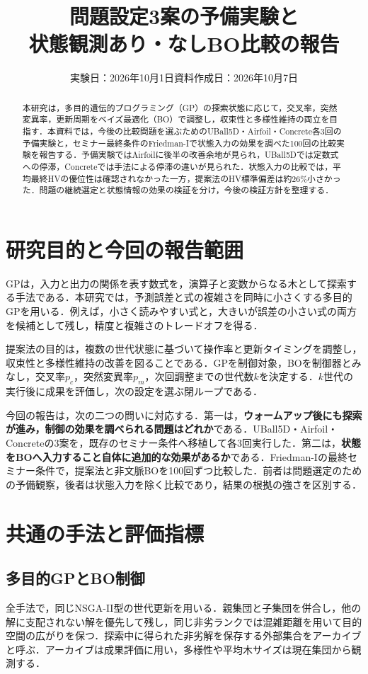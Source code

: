\documentclass[a4paper,10pt,twocolumn]{ltjsarticle}
\title{問題設定3案の予備実験と\\状態観測あり・なしBO比較の報告}
\author{}
\date{実験日：2026年10月1日\quad 資料作成日：2026年10月7日}
\begin{document}
\maketitle
\begin{abstract}
本研究は，多目的遺伝的プログラミング（GP）の探索状態に応じて，交叉率，突然変異率，更新周期をベイズ最適化（BO）で調整し，収束性と多様性維持の両立を目指す．本資料では，今後の比較問題を選ぶためのUBall5D・Airfoil・Concrete各3回の予備実験と，セミナー最終条件のFriedman-Iで状態入力の効果を調べた100回の比較実験を報告する．予備実験ではAirfoilに後半の改善余地が見られ，UBall5Dでは定数式への停滞，Concreteでは手法による停滞の違いが見られた．状態入力の比較では，平均最終HVの優位性は確認されなかった一方，提案法のHV標準偏差は約26\%小さかった．問題の継続選定と状態情報の効果の検証を分け，今後の検証方針を整理する．
\end{abstract}

\section{研究目的と今回の報告範囲}
GPは，入力と出力の関係を表す数式を，演算子と変数からなる木として探索する手法である．本研究では，予測誤差と式の複雑さを同時に小さくする多目的GPを用いる．例えば，小さく読みやすい式と，大きいが誤差の小さい式の両方を候補として残し，精度と複雑さのトレードオフを得る．

提案法の目的は，複数の世代状態に基づいて操作率と更新タイミングを調整し，収束性と多様性維持の改善を図ることである．GPを制御対象，BOを制御器とみなし，交叉率\(p_c\)，突然変異率\(p_m\)，次回調整までの世代数\(k\)を決定する．\(k\)世代の実行後に成果を評価し，次の設定を選ぶ閉ループである．

今回の報告は，次の二つの問いに対応する．第一は，\textbf{ウォームアップ後にも探索が進み，制御の効果を調べられる問題はどれか}である．UBall5D・Airfoil・Concreteの3案を，既存のセミナー条件へ移植して各3回実行した．第二は，\textbf{状態をBOへ入力すること自体に追加的な効果があるか}である．Friedman-Iの最終セミナー条件で，提案法と非文脈BOを100回ずつ比較した．前者は問題選定のための予備観察，後者は状態入力を除く比較であり，結果の根拠の強さを区別する．

\section{共通の手法と評価指標}
\subsection{多目的GPとBO制御}
全手法で，同じNSGA-II型の世代更新を用いる．親集団と子集団を併合し，他の解に支配されない解を優先して残し，同じ非劣ランクでは混雑距離を用いて目的空間の広がりを保つ．探索中に得られた非劣解を保存する外部集合をアーカイブと呼ぶ．アーカイブは成果評価に用い，多様性や平均木サイズは現在集団から観測する．
\end{document}
